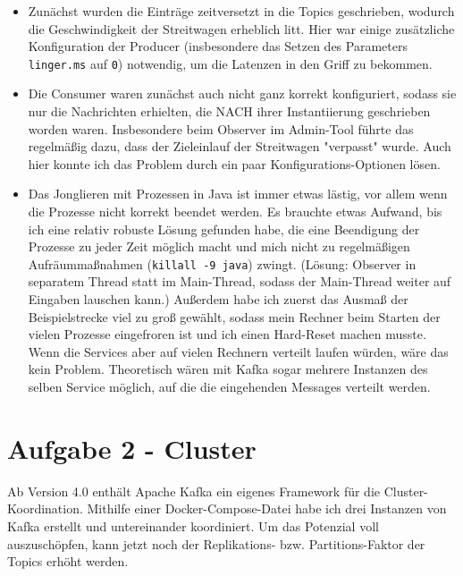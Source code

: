 \documentclass[12pt]{article}
\begin{document}
\begin{itemize}
	\item Zunächst wurden die Einträge zeitversetzt in die Topics geschrieben, wodurch die Geschwindigkeit der Streitwagen erheblich litt. 
	Hier war einige zusätzliche Konfiguration der Producer (insbesondere das Setzen des Parameters \texttt{linger.ms} auf \texttt{0}) notwendig, um die Latenzen in den Griff zu bekommen.
	
	\item Die Consumer waren zunächst auch nicht ganz korrekt konfiguriert, sodass sie nur die Nachrichten erhielten, die NACH ihrer Instantiierung geschrieben worden waren.
	Insbesondere beim Observer im Admin-Tool führte das regelmäßig dazu, dass der Zieleinlauf der Streitwagen "verpasst" wurde.
	Auch hier konnte ich das Problem durch ein paar Konfigurations-Optionen lösen.
	
	\item Das Jonglieren mit Prozessen in Java ist immer etwas lästig, vor allem wenn die Prozesse nicht korrekt beendet werden.
	Es brauchte etwas Aufwand, bis ich eine relativ robuste Lösung gefunden habe, die eine Beendigung der Prozesse zu jeder Zeit möglich macht und mich nicht zu regelmäßigen Aufräummaßnahmen (\texttt{killall -9 java}) zwingt. (Lösung: Observer in separatem Thread statt im Main-Thread, sodass der Main-Thread weiter auf Eingaben lauschen kann.)
	Außerdem habe ich zuerst das Ausmaß der Beispielstrecke viel zu groß gewählt, sodass mein Rechner beim Starten der vielen Prozesse eingefroren ist und ich einen Hard-Reset machen musste.
	Wenn die Services aber auf vielen Rechnern verteilt laufen würden, wäre das kein Problem.
	Theoretisch wären mit Kafka sogar mehrere Instanzen des selben Service möglich, auf die die eingehenden Messages verteilt werden.
\end{itemize}

\section{Aufgabe 2 - Cluster}
Ab Version 4.0 enthält Apache Kafka ein eigenes Framework für die Cluster-Koordination.
Mithilfe einer Docker-Compose-Datei habe ich drei Instanzen von Kafka erstellt und untereinander koordiniert.
Um das Potenzial voll auszuschöpfen, kann jetzt noch der Replikations- bzw. Partitions-Faktor der Topics erhöht werden.
\end{document}

